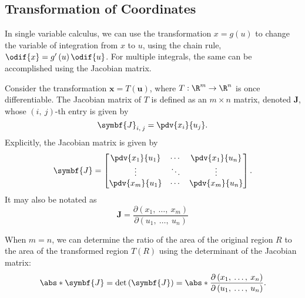 \documentclass{article}
\begin{document}
\subsection{Transformation of Coordinates}
In single variable calculus, we can use the transformation \(x =
g\left( u \right)\) to change the variable of integration from \(x\) to
\(u\), using the chain rule, \(\odif{x} = g'\left( u \right)
\odif{u}\). For multiple integrals, the same can be accomplished using
the Jacobian matrix.
\begin{definition}
    Consider the transformation \(\symbf{x} = T\left( \symbf{u} \right)\),
    where \(T : \R^m \to \R^n\) is once differentiable. The Jacobian
    matrix of \(T\) is defined as an \(m \times n\) matrix, denoted
    \(\symbf{J}\), whose \(\left( i,\: j \right)\)-th entry is given by
    \begin{equation*}
        \symbf{J}_{i,\: j} = \pdv{x_i}{u_j}.
    \end{equation*}
    Explicitly, the Jacobian matrix is given by
    \begin{equation*}
        \symbf{J} =
        \displaystyle
        \begin{bmatrix}
            \displaystyle\pdv{x_1}{u_1} & \displaystyle\cdots & \displaystyle\pdv{x_1}{u_n} \\
            \displaystyle\vdots         & \displaystyle\ddots & \displaystyle\vdots         \\
            \displaystyle\pdv{x_m}{u_1} & \displaystyle\cdots & \displaystyle\pdv{x_m}{u_n} \\
        \end{bmatrix}
        .
    \end{equation*}
    It may also be notated as
    \begin{equation*}
        \symbf{J} = \frac{\partial\left( x_1,\: \ldots,\: x_m \right)}{\partial\left( u_1,\: \ldots,\: u_n \right)}
    \end{equation*}
\end{definition}
\begin{definition}[Jacobian]
    When \(m = n\), we can determine the ratio of the area of the
    original region \(R\) to the area of the transformed region
    \(T\left( R \right)\) using the determinant of the Jacobian matrix:
    \begin{equation*}
        \abs*{\symbf{J}} = \det{\left( \symbf{J} \right)} = \abs*{\frac{\partial\left( x_1,\: \ldots,\: x_n \right)}{\partial\left( u_1,\: \ldots,\: u_n \right)}}.
    \end{equation*}
\end{definition}
\end{document}
